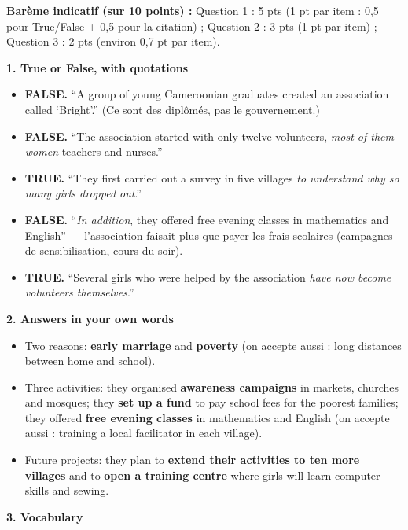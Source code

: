 \documentclass[11pt]{article}
\begin{document}
\begin{corrige}

\textbf{Barème indicatif (sur 10 points) :} Question 1 : 5 pts (1 pt par item : 0,5 pour True/False + 0,5 pour la citation) ; Question 2 : 3 pts (1 pt par item) ; Question 3 : 2 pts (environ 0,7 pt par item).

\textbf{1. True or False, with quotations}

\begin{itemize}
\item[a.] \textbf{FALSE.} ``A group of young Cameroonian graduates created an association called `Bright'.'' (Ce sont des diplômés, pas le gouvernement.)
\item[b.] \textbf{FALSE.} ``The association started with only twelve volunteers, \emph{most of them women} teachers and nurses.''
\item[c.] \textbf{TRUE.} ``They first carried out a survey in five villages \emph{to understand why so many girls dropped out}.''
\item[d.] \textbf{FALSE.} ``\emph{In addition}, they offered free evening classes in mathematics and English'' — l'association faisait plus que payer les frais scolaires (campagnes de sensibilisation, cours du soir).
\item[e.] \textbf{TRUE.} ``Several girls who were helped by the association \emph{have now become volunteers themselves}.''
\end{itemize}

\textbf{2. Answers in your own words}

\begin{itemize}
\item[a.] Two reasons: \textbf{early marriage} and \textbf{poverty} (on accepte aussi : long distances between home and school).
\item[b.] Three activities: they organised \textbf{awareness campaigns} in markets, churches and mosques; they \textbf{set up a fund} to pay school fees for the poorest families; they offered \textbf{free evening classes} in mathematics and English (on accepte aussi : training a local facilitator in each village).
\item[c.] Future projects: they plan to \textbf{extend their activities to ten more villages} and to \textbf{open a training centre} where girls will learn computer skills and sewing.
\end{itemize}

\textbf{3. Vocabulary}


\end{corrige}
\end{document}
